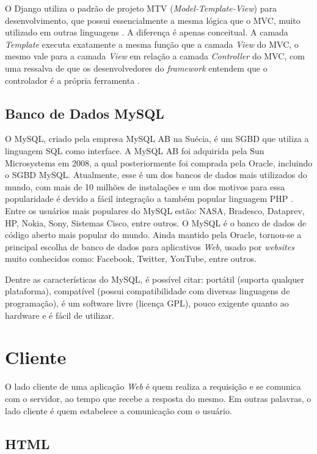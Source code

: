 \documentclass[
	12pt,				%
    oneside,			%
	a4paper,			%
	english,			%
	french,				%
	spanish,			%
	brazil,				%
	]{abntex2}
\begin{document}
O Django utiliza o padrão de projeto MTV (\textit{Model-Template-View}) para
desenvolvimento, que possui essencialmente a mesma lógica que o MVC,
muito utilizado em outras linguagens \cite{neto}. A diferença é apenas conceitual. A camada \textit{Template}
executa exatamente a mesma função que a camada \textit{View} do MVC, o mesmo vale para a camada \textit{View} em
relação a camada \textit{Controller} do MVC, com uma ressalva de que os desenvolvedores do \textit{framework} entendem
que o controlador é a própria ferramenta \cite{django}.

\subsection{Banco de Dados MySQL}
O MySQL, criado pela empresa MySQL AB na Suécia, é um SGBD que utiliza a
linguagem SQL como interface. A MySQL AB foi adquirida pela Sun Microsystems em
2008, a qual posteriormente foi comprada pela Oracle, incluindo o SGBD MySQL.
Atualmente, esse é um dos bancos de dados mais utilizados do mundo, com mais de
10 milhões de instalações e um dos motivos para essa popularidade é devido a fácil
integração a também popular linguagem PHP \cite{mottin}. Entre os usuários mais populares do MySQL estão: NASA, Bradesco, Dataprev, HP, Nokia, Sony, Sistemas Cisco, entre outros.
O MySQL é o banco de dados de código aberto mais popular do mundo. Ainda
mantido pela Oracle, tornou-se a principal escolha de banco de dados para aplicativos
\textit{Web}, usado por \textit{websites} muito conhecidos como: Facebook, Twitter, YouTube, entre
outros.

Dentre as características do MySQL, é possível citar: portátil (suporta qualquer plataforma), compatível (possui compatibilidade com diversas linguagens de programação), é um software livre (licença GPL), pouco exigente quanto ao hardware e é fácil de utilizar.

\section{Cliente}

O lado cliente de uma aplicação \textit{Web} é quem realiza a requisição e se comunica
com o servidor, ao tempo que recebe a resposta do mesmo. Em outras palavras, o
lado cliente é quem estabelece a comunicação com o usuário.

\subsection{HTML}
\end{document}
